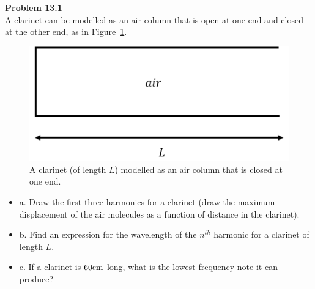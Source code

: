\begin{framed}
\textbf{Problem 13.1}\\
A clarinet can be modelled as an air column that is open at one end and closed at the other end, as in Figure~\ref{fig:waves:clarinetmodel}.

\begin{figure}[!htbp]
\centering
\includegraphics[width=0.5\linewidth]{files/clarinetmodel-8ed7d15265ce5f2a8af238d93b902b4e.png}
\caption[]{A clarinet (of length $L$) modelled as an air column that is closed at one end.}
\label{fig:waves:clarinetmodel}
\end{figure}

\begin{itemize}
\item a. Draw the first three harmonics for a clarinet (draw the maximum displacement of the air molecules as a function of distance in the clarinet).
\item b. Find an expression for the wavelength of the $n^{th}$ harmonic for a clarinet of length $L$.
\item c. If a clarinet is $60 {\rm cm}$ long, what is the lowest frequency note it can produce?
\end{itemize}
\end{framed}

